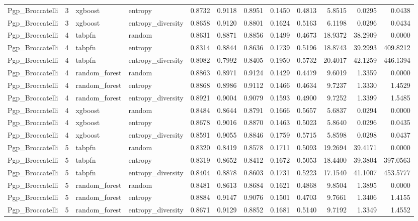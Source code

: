 \begin{tabular}{lrllrrrrrrrr}
Pgp_Broccatelli & 3 & xgboost & entropy & 0.8732 & 0.9118 & 0.8951 & 0.1450 & 0.4813 & 5.8515 & 0.0295 & 0.0438 \\
Pgp_Broccatelli & 3 & xgboost & entropy_diversity & 0.8658 & 0.9120 & 0.8801 & 0.1624 & 0.5163 & 6.1198 & 0.0296 & 0.0434 \\
Pgp_Broccatelli & 4 & tabpfn & random & 0.8631 & 0.8871 & 0.8856 & 0.1499 & 0.4673 & 18.9372 & 38.2909 & 0.0000 \\
Pgp_Broccatelli & 4 & tabpfn & entropy & 0.8314 & 0.8844 & 0.8636 & 0.1739 & 0.5196 & 18.8743 & 39.2993 & 409.8212 \\
Pgp_Broccatelli & 4 & tabpfn & entropy_diversity & 0.8082 & 0.7992 & 0.8405 & 0.1950 & 0.5732 & 20.4017 & 42.1259 & 446.1394 \\
Pgp_Broccatelli & 4 & random_forest & random & 0.8863 & 0.8971 & 0.9124 & 0.1429 & 0.4479 & 9.6019 & 1.3359 & 0.0000 \\
Pgp_Broccatelli & 4 & random_forest & entropy & 0.8868 & 0.8986 & 0.9112 & 0.1466 & 0.4634 & 9.7237 & 1.3330 & 1.4529 \\
Pgp_Broccatelli & 4 & random_forest & entropy_diversity & 0.8921 & 0.9004 & 0.9079 & 0.1593 & 0.4900 & 9.7252 & 1.3399 & 1.5485 \\
Pgp_Broccatelli & 4 & xgboost & random & 0.8484 & 0.8644 & 0.8791 & 0.1666 & 0.5657 & 5.6837 & 0.0294 & 0.0000 \\
Pgp_Broccatelli & 4 & xgboost & entropy & 0.8678 & 0.9016 & 0.8870 & 0.1463 & 0.5023 & 5.8640 & 0.0296 & 0.0435 \\
Pgp_Broccatelli & 4 & xgboost & entropy_diversity & 0.8591 & 0.9055 & 0.8846 & 0.1759 & 0.5715 & 5.8598 & 0.0298 & 0.0437 \\
Pgp_Broccatelli & 5 & tabpfn & random & 0.8320 & 0.8419 & 0.8578 & 0.1711 & 0.5093 & 19.2694 & 39.4171 & 0.0000 \\
Pgp_Broccatelli & 5 & tabpfn & entropy & 0.8319 & 0.8652 & 0.8412 & 0.1672 & 0.5053 & 18.4400 & 39.3804 & 397.0563 \\
Pgp_Broccatelli & 5 & tabpfn & entropy_diversity & 0.8404 & 0.8878 & 0.8603 & 0.1731 & 0.5223 & 17.1540 & 41.1007 & 453.5777 \\
Pgp_Broccatelli & 5 & random_forest & random & 0.8481 & 0.8613 & 0.8684 & 0.1621 & 0.4868 & 9.8504 & 1.3895 & 0.0000 \\
Pgp_Broccatelli & 5 & random_forest & entropy & 0.8884 & 0.9147 & 0.9076 & 0.1501 & 0.4703 & 9.7661 & 1.3406 & 1.4155 \\
Pgp_Broccatelli & 5 & random_forest & entropy_diversity & 0.8671 & 0.9129 & 0.8852 & 0.1681 & 0.5140 & 9.7192 & 1.3349 & 1.4552 \\

\end{tabular}
